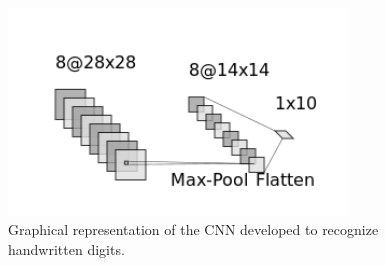 \begin{figure}[htb]
\centering
\includegraphics[width=0.8\textwidth]{figures/cnn_2d}
\caption{Graphical representation of the CNN developed to recognize handwritten digits.}
\label{fig:cnn2d}
\end{figure}

